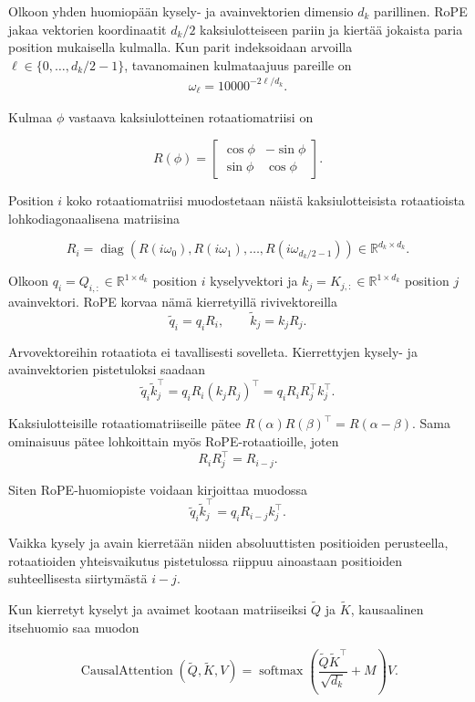 Olkoon yhden huomiopään kysely- ja avainvektorien dimensio \(d_k\)
parillinen. RoPE jakaa vektorien koordinaatit \(d_k/2\)
kaksiulotteiseen pariin ja kiertää jokaista paria position mukaisella
kulmalla. Kun parit indeksoidaan arvoilla
\(\ell \in \{0,\dots,d_k/2-1\}\), tavanomainen kulmataajuus pareille on
\begin{align*}
  \omega_{\ell}
  =
  10000^{-2\ell/d_k}.
\end{align*}

Kulmaa \(\phi\) vastaava kaksiulotteinen rotaatiomatriisi on

$$
R(\phi)
=
\begin{bmatrix}
  \cos \phi & -\sin \phi \\
  \sin \phi & \cos \phi
\end{bmatrix}.
$$

Position \(i\) koko rotaatiomatriisi muodostetaan näistä
kaksiulotteisista rotaatioista lohkodiagonaalisena matriisina

$$
R_i
=
\operatorname{diag}
\left(
  R(i\omega_0),
  R(i\omega_1),
  \dots,
  R\left(i\omega_{d_k/2-1}\right)
\right)
\in
\mathbb{R}^{d_k \times d_k}.
$$

Olkoon \(q_i = Q_{i,:} \in \mathbb{R}^{1 \times d_k}\) position \(i\) kyselyvektori ja
\(k_j = K_{j,:} \in \mathbb{R}^{1 \times d_k}\) position \(j\) avainvektori. RoPE korvaa
nämä kierretyillä rivivektoreilla
$$
\tilde q_i = q_i R_i,
\qquad
\tilde k_j = k_j R_j.
$$

Arvovektoreihin rotaatiota ei tavallisesti sovelleta. Kierrettyjen
kysely- ja avainvektorien pistetuloksi saadaan
$$
\tilde q_i \tilde k_j^{\top}
=
q_i R_i (k_j R_j)^{\top}
=
q_i R_i R_j^{\top} k_j^{\top}.
$$

Kaksiulotteisille rotaatiomatriiseille pätee
\(R(\alpha)R(\beta)^{\top}=R(\alpha-\beta)\). Sama ominaisuus pätee
lohkoittain myös RoPE-rotaatioille, joten
$$
R_i R_j^{\top}
=
R_{i-j}.
$$

Siten RoPE-huomiopiste voidaan kirjoittaa muodossa
$$
\tilde q_i \tilde k_j^{\top}
=
q_i R_{i-j} k_j^{\top}.
$$

Vaikka kysely ja avain kierretään niiden absoluuttisten positioiden
perusteella, rotaatioiden yhteisvaikutus pistetulossa riippuu ainoastaan
positioiden suhteellisesta siirtymästä \(i-j\).

Kun kierretyt kyselyt ja avaimet kootaan matriiseiksi
\(\tilde Q\) ja \(\tilde K\), kausaalinen itsehuomio saa muodon

$$
\operatorname{CausalAttention}
\left(
  \tilde Q,\tilde K,V
\right)
=
\operatorname{softmax}
\left(
  \frac{\tilde Q\tilde K^{\top}}{\sqrt{d_k}}
  +
  M
\right)V.
$$

